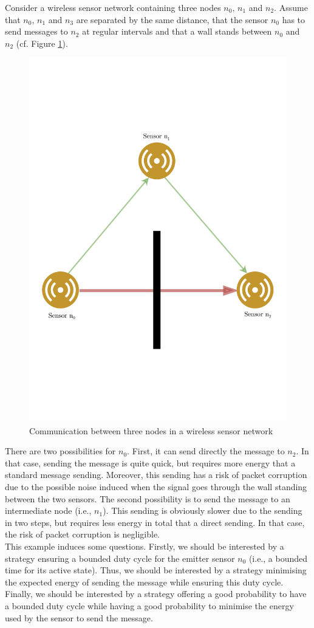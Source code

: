 \begin{example}\label{main-example}
Consider a wireless sensor network containing three nodes $n_0,\, n_1$ and $n_2$. Assume that $n_0, \, n_1$ and $n_3$ are separated by the same distance, that the sensor $n_0$ has to send messages to $n_2$ at regular intervals and that a wall stands between $n_0$ and $n_2$ (cf. Figure \ref{sensor_net}).
\begin{figure}[h!]
  \centering
  \includegraphics[width=0.7\linewidth]{resources/example3}
  \caption{Communication between three nodes in a wireless sensor network} \label{sensor_net}
\end{figure}
There are two possibilities for $n_0$. First, it can send directly the message to $n_2$. In that case, sending the message is quite quick, but requires more energy that a standard message sending. %
Moreover, this sending has a risk of packet corruption due to the possible noise induced when the signal goes through the wall standing between the two sensors.
The second possibility is to send the message to an intermediate node (i.e., $n_1$). This sending is obviously slower due to the sending in two steps, but requires less energy in total that a direct sending.
In that case, the risk of packet corruption is negligible. \\
This example induces some questions. Firstly, we should be interested by a strategy ensuring a bounded duty cycle for the emitter sensor $n_0$ (i.e., a bounded time for its active state).
Thus, we should be interested by a strategy minimising the expected energy of sending the message while ensuring this duty cycle.
Finally, we should be interested by a strategy offering a good probability to have a bounded duty cycle while having a good probability to minimise the energy used by the sensor to send the message.
\end{example}
